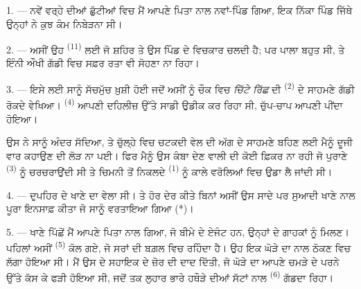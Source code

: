 

\VUsaut{4.0mm}
\VUsaut{3.0mm}
\VUfilet{16mm}
\VUsaut{5.6mm}
\VUsaut{3.0mm}

\VUsaut{3.0mm}

\VUsaut{4.0mm}

1. --- ਨਵੇਂ ਵਰ੍ਹੇ ਦੀਆਂ ਛੁੱਟੀਆਂ ਵਿਚ ਮੈਂ ਆਪਣੇ ਪਿਤਾ ਨਾਲ ਨਵਾਂ-ਪਿੰਡ ਗਿਆ, ਇਕ ਨਿੱਕਾ
ਪਿੰਡ ਜਿੱਥੇ ਉਨ੍ਹਾਂ ਨੇ ਕੁਝ ਕੰਮ ਨਿਬੇੜਨਾ ਸੀ।

2. --- ਅਸੀਂ ਉਹ  \textsuperscript{(11)} ਲਈ ਜੋ ਸ਼ਹਿਰ ਤੇ ਉਸ ਪਿੰਡ ਦੇ
ਵਿਚਕਾਰ ਚਲਦੀ ਹੈ; ਪਰ ਪਾਲਾ ਬਹੁਤ ਸੀ, ਤੇ ਇੰਨੀ ਔਖੀ ਗੱਡੀ ਵਿਚ ਸਫ਼ਰ ਰਤਾ ਵੀ ਸੋਹਣਾ ਨਾ
ਰਿਹਾ।

3. --- ਇਸੇ ਲਈ ਸਾਨੂੰ ਸੱਚਮੁੱਚ ਖ਼ੁਸ਼ੀ ਹੋਈ ਜਦੋਂ ਅਸੀਂ  ਨੂੰ ਚੌਕ ਵਿਚ
\textit{ਚਿੱਟੇ ਰਿੱਛ} ਦੀ  \textsuperscript{(2)} ਦੇ ਸਾਹਮਣੇ ਗੱਡੀ ਰੋਕਦੇ
ਵੇਖਿਆ।  \textsuperscript{(4)} ਆਪਣੀ ਦਹਿਲੀਜ਼ ਉੱਤੇ ਸਾਡੀ ਉਡੀਕ ਕਰ
ਰਿਹਾ ਸੀ, ਚੁੱਪ-ਚਾਪ ਆਪਣੀ  ਪੀਂਦਾ ਹੋਇਆ।

ਉਸ ਨੇ ਸਾਨੂੰ ਅੰਦਰ ਸੱਦਿਆ, ਤੇ ਚੁੱਲ੍ਹੇ ਵਿਚ ਚਟਕਦੀ ਵੇਲ ਦੀ ਅੱਗ ਦੇ ਸਾਹਮਣੇ ਬਹਿਣ ਲਈ
ਮੈਨੂੰ ਦੂਜੀ ਵਾਰ ਕਹਾਉਣ ਦੀ ਲੋੜ ਨਾ ਪਈ। ਫਿਰ ਮੈਨੂੰ ਉਸ ਕੰਬਾ ਦੇਣ ਵਾਲੀ  ਦੀ ਕੋਈ ਫ਼ਿਕਰ ਨਾ ਰਹੀ ਜੋ ਪੁਰਾਣੇ  \textsuperscript{(3)} ਨੂੰ
ਚਰਚਰਾਉਂਦੀ ਸੀ ਤੇ ਚਿਮਨੀ ਤੋਂ ਨਿਕਲਦੇ  \textsuperscript{(1)} ਨੂੰ ਕਾਲੇ
ਵਰੋਲਿਆਂ ਵਿਚ ਉਡਾ ਲੈ ਜਾਂਦੀ ਸੀ।

4. --- ਦੁਪਹਿਰ ਦੇ ਖਾਣੇ ਦਾ ਵੇਲਾ ਸੀ। ਤੇ ਹੋਰ ਦੇਰ ਕੀਤੇ ਬਿਨਾਂ ਅਸੀਂ ਉਸ ਸਾਦੇ ਪਰ ਸੁਆਦੀ
ਖਾਣੇ ਨਾਲ ਪੂਰਾ ਇਨਸਾਫ਼ ਕੀਤਾ ਜੋ ਸਾਨੂੰ ਵਰਤਾਇਆ ਗਿਆ (*)।

\VUsaut{3.0mm}

5. --- ਖਾਣੇ ਪਿੱਛੋਂ ਮੈਂ ਆਪਣੇ ਪਿਤਾ ਨਾਲ ਗਿਆ, ਜੋ ਬੀਮੇ ਦੇ ਏਜੰਟ ਹਨ, ਉਨ੍ਹਾਂ ਦੇ ਗਾਹਕਾਂ
ਨੂੰ ਮਿਲਣ। ਪਹਿਲਾਂ ਅਸੀਂ  \textsuperscript{(5)} ਕੋਲ ਗਏ, ਜੋ ਸਰਾਂ ਦੀ ਬਗ਼ਲ
ਵਿਚ ਰਹਿੰਦਾ ਹੈ। ਉਹ ਇਕ ਘੋੜੇ ਦਾ ਨਾਲ ਠੋਕਣ ਵਿਚ ਲੱਗਾ ਹੋਇਆ ਸੀ। ਮੈਂ ਉਸ ਦੇ ਸਹਾਇਕ ਦੇ ਜ਼ੋਰ
ਦੀ ਦਾਦ ਦਿੱਤੀ, ਜੋ ਘੋੜੇ ਦਾ  ਆਪਣੇ ਚਮੜੇ ਦੇ ਪਰਨੇ ਉੱਤੇ ਕੱਸ ਕੇ ਫੜੀ ਹੋਇਆ
ਸੀ, ਜਦੋਂ ਤਕ ਲੁਹਾਰ ਭਾਰੇ ਹਥੌੜੇ ਦੀਆਂ ਸੱਟਾਂ ਨਾਲ  \textsuperscript{(6)}
ਗੱਡਦਾ ਰਿਹਾ।

